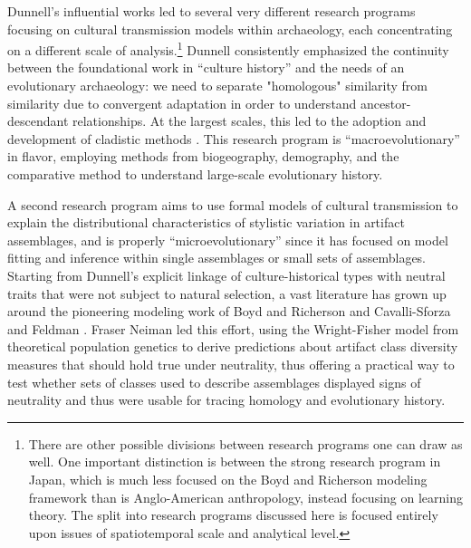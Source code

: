 Dunnell's influential works led to several very different research programs focusing on cultural transmission models within archaeology, each concentrating on a different scale of analysis.\footnote{There are other possible divisions between research programs one can draw as well.  One important distinction is between the strong research program in Japan, which is much less focused on the Boyd and Richerson modeling framework than is Anglo-American anthropology, instead focusing on learning theory.  The split into research programs discussed here is focused entirely upon issues of spatiotemporal scale and analytical level.}  Dunnell  consistently emphasized the continuity between the foundational work in ``culture history'' and the needs of an evolutionary archaeology: we need to separate "homologous" similarity from similarity due to convergent adaptation in order to understand ancestor-descendant relationships.  At the largest scales, this led to the adoption and development of cladistic methods \citep{borgerhoff2006cultural,Lyman1997a,Lyman2006a,o1999seriation,o2000time,o2001cladistics,o2003cladistics,o2003resolving,OBrian2000,prentiss2019cultural,PRENTISS201564,Temkin2007}.  This research program is ``macroevolutionary'' in flavor, employing methods from biogeography, demography, and the comparative method to understand large-scale evolutionary history.  

A second research program aims to use formal models of cultural transmission to explain the distributional characteristics of stylistic variation in artifact assemblages, and is properly ``microevolutionary'' since it has focused on model fitting and inference within single assemblages or small sets of assemblages.  Starting from Dunnell's \citeyearpar{Dunnell1978} explicit linkage of culture-historical types with neutral traits that were not subject to natural selection, a vast literature has grown up around the pioneering modeling work of Boyd and Richerson \citeyearpar{BR1985} and Cavalli-Sforza and Feldman \citeyearpar{CF1981}.  Fraser Neiman \citeyearpar{Neiman1995} led this effort, using the Wright-Fisher model from theoretical population genetics to derive predictions about artifact class diversity measures that should hold true under neutrality, thus offering a practical way to test whether sets of classes used to describe assemblages displayed signs of neutrality and thus were usable for tracing homology and evolutionary history.  

